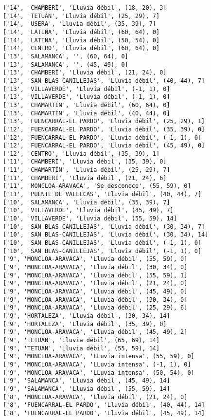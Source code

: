 \documentclass[11pt]{article}
\begin{document}
\begin{Verbatim}[commandchars=\\\{\}]
['14', 'CHAMBERÍ', 'Lluvia débil', (18, 20), 3]
['14', 'TETUÁN', 'Lluvia débil', (25, 29), 7]
['14', 'USERA', 'Lluvia débil', (35, 39), 7]
['14', 'LATINA', 'Lluvia débil', (60, 64), 0]
['14', 'LATINA', 'Lluvia débil', (50, 54), 0]
['14', 'CENTRO', 'Lluvia débil', (60, 64), 0]
['13', 'SALAMANCA', '', (60, 64), 0]
['13', 'SALAMANCA', '', (45, 49), 0]
['13', 'CHAMBERÍ', 'Lluvia débil', (21, 24), 0]
['13', 'SAN BLAS-CANILLEJAS', 'Lluvia débil', (40, 44), 7]
['13', 'VILLAVERDE', 'Lluvia débil', (-1, 1), 0]
['13', 'VILLAVERDE', 'Lluvia débil', (-1, 1), 0]
['13', 'CHAMARTÍN', 'Lluvia débil', (60, 64), 0]
['13', 'CHAMARTÍN', 'Lluvia débil', (40, 44), 0]
['13', 'FUENCARRAL-EL PARDO', 'Lluvia débil', (25, 29), 1]
['12', 'FUENCARRAL-EL PARDO', 'Lluvia débil', (35, 39), 0]
['12', 'FUENCARRAL-EL PARDO', 'Lluvia débil', (-1, 1), 0]
['12', 'FUENCARRAL-EL PARDO', 'Lluvia débil', (45, 49), 0]
['12', 'CENTRO', 'Lluvia débil', (35, 39), 1]
['11', 'CHAMBERÍ', 'Lluvia débil', (35, 39), 0]
['11', 'CHAMARTÍN', 'Lluvia débil', (25, 29), 7]
['11', 'CHAMBERÍ', 'Lluvia débil', (21, 24), 6]
['11', 'MONCLOA-ARAVACA', 'Se desconoce', (55, 59), 0]
['11', 'PUENTE DE VALLECAS', 'Lluvia débil', (40, 44), 7]
['10', 'SALAMANCA', 'Lluvia débil', (35, 39), 7]
['10', 'VILLAVERDE', 'Lluvia débil', (45, 49), 7]
['10', 'VILLAVERDE', 'Lluvia débil', (55, 59), 14]
['10', 'SAN BLAS-CANILLEJAS', 'Lluvia débil', (30, 34), 7]
['10', 'SAN BLAS-CANILLEJAS', 'Lluvia débil', (30, 34), 14]
['10', 'SAN BLAS-CANILLEJAS', 'Lluvia débil', (-1, 1), 0]
['10', 'SAN BLAS-CANILLEJAS', 'Lluvia débil', (-1, 1), 0]
['9', 'MONCLOA-ARAVACA', 'Lluvia débil', (55, 59), 0]
['9', 'MONCLOA-ARAVACA', 'Lluvia débil', (30, 34), 0]
['9', 'MONCLOA-ARAVACA', 'Lluvia débil', (55, 59), 1]
['9', 'MONCLOA-ARAVACA', 'Lluvia débil', (21, 24), 0]
['9', 'MONCLOA-ARAVACA', 'Lluvia débil', (45, 49), 0]
['9', 'MONCLOA-ARAVACA', 'Lluvia débil', (30, 34), 0]
['9', 'MONCLOA-ARAVACA', 'Lluvia débil', (25, 29), 6]
['9', 'HORTALEZA', 'Lluvia débil', (30, 34), 14]
['9', 'HORTALEZA', 'Lluvia débil', (35, 39), 0]
['9', 'MONCLOA-ARAVACA', 'Lluvia débil', (45, 49), 2]
['9', 'TETUÁN', 'Lluvia débil', (65, 69), 14]
['9', 'TETUÁN', 'Lluvia débil', (55, 59), 14]
['9', 'MONCLOA-ARAVACA', 'LLuvia intensa', (55, 59), 0]
['9', 'MONCLOA-ARAVACA', 'LLuvia intensa', (-1, 1), 0]
['9', 'MONCLOA-ARAVACA', 'LLuvia intensa', (50, 54), 0]
['9', 'SALAMANCA', 'Lluvia débil', (45, 49), 14]
['9', 'SALAMANCA', 'Lluvia débil', (55, 59), 14]
['8', 'MONCLOA-ARAVACA', 'Lluvia débil', (21, 24), 0]
['8', 'FUENCARRAL-EL PARDO', 'Lluvia débil', (40, 44), 14]
['8', 'FUENCARRAL-EL PARDO', 'Lluvia débil', (45, 49), 14]

\end{Verbatim}
\end{document}
